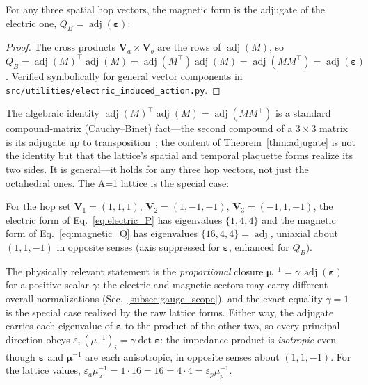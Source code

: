 \begin{theorem}
\label{thm:adjugate}
For any three spatial hop vectors, the magnetic form is the adjugate of the electric
one, $Q_B = \operatorname{adj}(\boldsymbol{\varepsilon})$:
\begin{equation}
    \label{eq:adjugate}
    
\end{equation}
\end{theorem}
\begin{proof}
The cross products $\mathbf{V}_a\!\times\!\mathbf{V}_b$ are the rows of
$\operatorname{adj}(M)$, so $Q_B = \operatorname{adj}(M)^{\!\top}\operatorname{adj}(M)
= \operatorname{adj}(M^{\!\top})\operatorname{adj}(M) = \operatorname{adj}(MM^{\!\top})
= \operatorname{adj}(\boldsymbol{\varepsilon})$. Verified symbolically for general
vector components in \texttt{src/utilities/electric\_induced\_action.py}.
\end{proof}

The algebraic identity $\operatorname{adj}(M)^{\!\top}\operatorname{adj}(M) =
\operatorname{adj}(MM^{\!\top})$ is a standard compound-matrix (Cauchy--Binet) fact---the
second compound of a $3\times3$ matrix is its adjugate up to
transposition~\cite{hornjohnson2013}; the content of Theorem~\ref{thm:adjugate} is not the
identity but that the lattice's spatial and temporal plaquette forms realize its two
sides. It is general---it holds for any three hop vectors, not just the octahedral ones.
The A=1 lattice is the special case:

\begin{corollary}
\label{cor:lattice_blocks}
For the hop set $\mathbf{V}_1=(1,1,1)$, $\mathbf{V}_2=(1,-1,-1)$,
$\mathbf{V}_3=(-1,1,-1)$, the electric form of Eq.~\eqref{eq:electric_P} has
eigenvalues $\{1,4,4\}$ and the magnetic form of Eq.~\eqref{eq:magnetic_Q} has
eigenvalues $\{16,4,4\} = \operatorname{adj}$, uniaxial about $(1,1,-1)$ in opposite
senses (axis suppressed for $\boldsymbol{\varepsilon}$, enhanced for $Q_B$).
\end{corollary}

The physically relevant statement is the \emph{proportional} closure
$\boldsymbol{\mu}^{-1} = \gamma\,\operatorname{adj}(\boldsymbol{\varepsilon})$ for a
positive scalar $\gamma$: the electric and magnetic sectors may carry different
overall normalizations (Sec.~\ref{subsec:gauge_scope}), and the exact equality
$\gamma=1$ is the special case realized by the raw lattice forms. Either way, the
adjugate carries each eigenvalue of $\boldsymbol{\varepsilon}$ to the product of the
other two, so every principal direction obeys $\varepsilon_i\,(\mu^{-1})_i =
\gamma\det\boldsymbol{\varepsilon}$: the impedance product is \emph{isotropic} even
though $\boldsymbol{\varepsilon}$ and $\boldsymbol{\mu}^{-1}$ are each anisotropic,
in opposite senses about $(1,1,-1)$. For the lattice values,
$\varepsilon_a\mu^{-1}_a = 1\cdot16 = 16 = 4\cdot4 = \varepsilon_p\mu^{-1}_p$.

